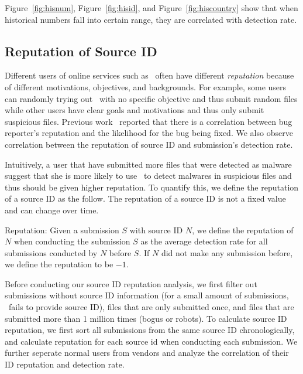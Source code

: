 Figure~\ref{fig:hisnum}, Figure~\ref{fig:hisid}, and Figure~\ref{fig:hiscountry} show that 
when historical numbers fall into certain range, they are correlated with detection rate. 
\fi

\subsection{Reputation of Source ID}
\label{sec:reputation}


Different users of online services such as \vt\ often have different {\em reputation} 
because of different motivations, objectives, and backgrounds.
For example, some users can randomly trying out \vt\ with no specific objective and thus submit random files
while other users have clear goals and motivations and thus only submit suspicious files.
Previous work~\cite{GuoICSE2010} reported that there is a correlation between bug reporter’s reputation and the likelihood for the bug being fixed. 
We also observe correlation between the reputation of source ID and submission’s detection rate. 

Intuitively, a user that have submitted more files that were detected as malware suggest 
that she is more likely to use \vt\ to detect malwares in suspicious files 
and thus should be given higher reputation.
To quantify this, we define the reputation of a source ID as the follow.
The reputation of a source ID is not a fixed value and can change over time. 

\begin{definition}{Reputation:}
Given a submission $S$ with source ID $N$, 
we define the reputation of $N$ when conducting the submission $S$ as the average detection rate for all submissions conducted by $N$ before $S$. 
If $N$ did not make any submission before, we define the reputation to be $-1$. 
\end{definition}

Before conducting our source ID reputation analysis, we first filter out submissions without source ID information (for a small amount of submissions, \vt\ fails to provide source ID),
files that are only submitted once, and files that are submitted more than 1 million times (bogus or robots).
To calculate source ID reputation, we first sort all submissions from the same source ID chronologically, 
and calculate reputation for each source id when conducting each submission. 
We further seperate normal users from vendors and analyze the correlation of their ID reputation and detection rate.

